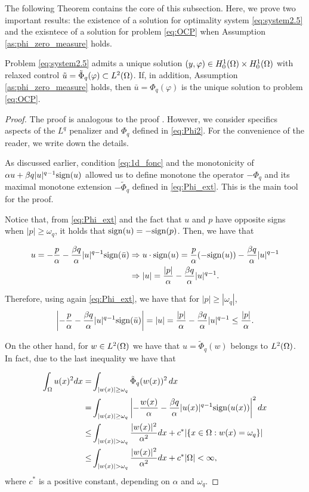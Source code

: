 The following Theorem contains the core of this subsection. Here, we prove two important results: the existence
of a solution for optimality system \eqref{eq:system2.5} and the exisntece of a solution for problem \eqref{eq:OCP}
 when Assumption \ref{as:phi_zero_measure} holds.
 \begin{theorem}\label{t:existence}
		Problem \eqref{eq:system2.5} admits a unique solution $(y,\varphi) \in H_{0}^{1}(\Omega) \times H_{0}^{1}(\Omega)$ with relaxed control $\tilde u = \tilde \Phi_q(\varphi)\subset L^2(\Omega)$. 
		If, in addition, Assumption \ref{as:phi_zero_measure} holds, then $\bar u = \Phi_q(\varphi)$ is the unique solution to problem \eqref{eq:OCP}.\end{theorem}
	\begin{proof}
		 The proof is analogous to the proof \cite[Section 2.2]{ito-kunisch2014}. However, we consider specifics aspects of the $L^q$ penalizer and $\Phi_q$ defined in \eqref{eq:Phi2}.  For the convenience of the reader, we write down the details. 
		
		As discussed earlier, condition \eqref{eq:1d_fonc} and the monotonicity of $\alpha u + \beta q |u|^{q-1}\mathrm{sign}(u)$ allowed us to define monotone the operator $-\Phi_q$ and its maximal monotone extension $-\tilde\Phi_q$  defined in \eqref{eq:Phi_ext}. This is the main tool for the proof.  
		
Notice that, from \eqref{eq:Phi_ext} and the fact that $u$ and $p$ have opposite signs when $|p|\geq \omega_q$, it holds that $\mathrm{sign}(u)=-\mathrm{sign}(p)$. Then, we have that  
		
		\begin{align*}
			u=-\frac{p}{\alpha} - \frac{\beta q}{\alpha} |u|^{q-1}{\mathrm{sign}(\bar u)}&\Rightarrow u\cdot\mathrm{sign}(u)=\frac{p}{\alpha}(-\mathrm{sign}(u)) - \frac{\beta q}{\alpha} |u|^{q-1}\\
			&\Rightarrow |u|= \frac{|p|}{\alpha} - \frac{\beta q}{\alpha} |u|^{q-1}.
		\end{align*}
		
		Therefore, using again \eqref{eq:Phi_ext}, we have that for $|p|\ge|\omega_q|$,
		$$
		\left|-\frac{p}{\alpha} - \frac{\beta q}{\alpha} |u|^{q-1}{\mathrm{sign}(\bar u)} \right|= |u| =\frac{|p|}{\alpha}-\frac{\beta q}{\alpha}|u|^{q-1} \leq \frac{|p|}{\alpha}.
		$$		

		On the other hand, for $w \in L^2(\Omega)$ we have that $u=\tilde\Phi_q(w)$ belongs to 
		$L^2(\Omega)$. In fact, due to the last inequality we have that 
		
		\begin{align*}
			\int_\om u(x)^2 dx =& \int_{|w(x)|\geq \omega_q} \tilde\Phi_q(w(x))^2 \,dx\\		
			=& \int_{|w(x)|\geq  \omega_q} \l|-\frac{w(x)}{\alpha} - \frac{\beta q}{\alpha} |u(x)|^{q-1}\sign(u(x)) \r|^2 dx \\
			\leq& \int_{|w(x)|>  \omega_q}  \frac{|w(x)|^2}{\alpha^2}  dx+ c^* |\{x\in\om: w(x)=\omega_q\}| \\
			\leq& \int_{|w(x)|>  \omega_q}  \frac{|w(x)|^2}{\alpha^2}  dx+ c^* |\om|<\infty,
		\end{align*}
		where $c^*$ is a positive constant, depending on $\alpha$ and $\omega_q$.
		

\end{proof}
